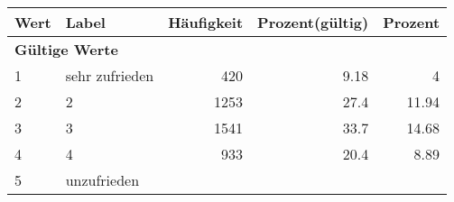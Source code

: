      \begin{longtable}{lXrrr}
     \toprule
     \textbf{Wert} & \textbf{Label} & \textbf{Häufigkeit} & \textbf{Prozent(gültig)} & \textbf{Prozent} \\
     \endhead
     \midrule
     \multicolumn{5}{l}{\textbf{Gültige Werte}}\\

     1 &
     \multicolumn{1}{X}{ sehr zufrieden   } &


       \num{420} &
       \num[round-mode=places,round-precision=2]{9.18} &
         \num[round-mode=places,round-precision=2]{4} \\

     2 &
     \multicolumn{1}{X}{ 2   } &


       \num{1253} &
       \num[round-mode=places,round-precision=2]{27.4} &
         \num[round-mode=places,round-precision=2]{11.94} \\

     3 &
     \multicolumn{1}{X}{ 3   } &


       \num{1541} &
       \num[round-mode=places,round-precision=2]{33.7} &
         \num[round-mode=places,round-precision=2]{14.68} \\

     4 &
     \multicolumn{1}{X}{ 4   } &


       \num{933} &
       \num[round-mode=places,round-precision=2]{20.4} &
         \num[round-mode=places,round-precision=2]{8.89} \\

     5 &
     \multicolumn{1}{X}{ unzufrieden   } &



\end{longtable}

